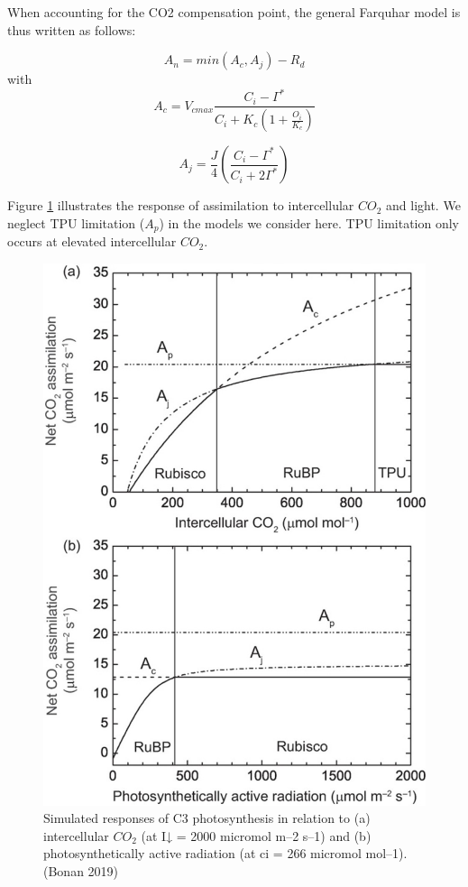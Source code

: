 \documentclass[12pt,oneside]{book}
\begin{document}
When accounting for the CO2 compensation point, the general Farquhar
model is thus written as follows:

\[
A_n=min(A_c,A_j)-R_d
\] with \[
A_c = V_{cmax}\frac{C_i-\Gamma^*}{C_i+K_c\left(1+\frac{O_i}{K_c}\right)}
\]

\[
A_j = \frac{J}{4}\left(\frac{C_i-\Gamma^*}{C_i+2\Gamma^*}\right)
\]

Figure \ref{fig:f28} illustrates the response of assimilation to
intercellular \(CO_2\) and light. We neglect TPU limitation (\(A_p\)) in
the models we consider here. TPU limitation only occurs at elevated
intercellular \(CO_2\).

\begin{figure}

{\centering \includegraphics[width=0.8\linewidth]{figures/chap2/simulated_responses} 

}

\caption{Simulated responses of C3 photosynthesis in relation to (a) intercellular $CO_2$ (at I↓ = 2000 micromol m–2 s–1) and (b) photosynthetically active radiation (at ci = 266 micromol mol–1). (Bonan 2019)}\label{fig:f28}
\end{figure}
\end{document}

